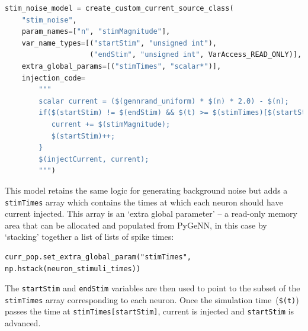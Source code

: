 \documentclass[utf8]{frontiersSCNS} %
\begin{document}
\begin{lstlisting}[language=python]
stim_noise_model = create_custom_current_source_class(
    "stim_noise",
    param_names=["n", "stimMagnitude"],
    var_name_types=[("startStim", "unsigned int"), 
                    ("endStim", "unsigned int", VarAccess_READ_ONLY)],
    extra_global_params=[("stimTimes", "scalar*")],
    injection_code=
        """
        scalar current = ($(gennrand_uniform) * $(n) * 2.0) - $(n);
        if($(startStim) != $(endStim) && $(t) >= $(stimTimes)[$(startStim)]) {
           current += $(stimMagnitude);
           $(startStim)++;
        }
        $(injectCurrent, current);
        """)
\end{lstlisting}
This model retains the same logic for generating background noise but adds a \lstinline{stimTimes} array which contains the times at which each neuron should have current injected.
This array is an `extra global parameter' -- a read-only memory area that can be allocated and populated from PyGeNN, in this case by `stacking' together a list of lists of spike times:
\begin{lstlisting}
curr_pop.set_extra_global_param("stimTimes", np.hstack(neuron_stimuli_times))
\end{lstlisting}
The \lstinline{startStim} and \lstinline{endStim} variables are then used to point to the subset of the \lstinline{stimTimes} array corresponding to each neuron.
Once the simulation time~(\lstinline{$(t)}) passes the time at \lstinline{stimTimes[startStim]}, current is injected and \lstinline{startStim} is advanced.
\end{document}
